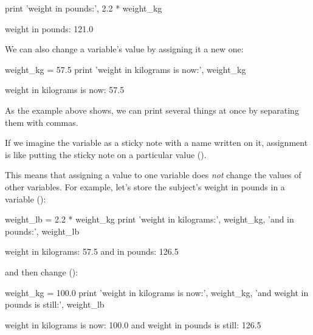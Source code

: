 \begin{VerbIn}
print 'weight in pounds:', 2.2 * weight_kg
\end{VerbIn}

\begin{VerbOut}
weight in pounds: 121.0
\end{VerbOut}

We can also change a variable's value by assigning it a new one:

\begin{VerbIn}
weight_kg = 57.5
print 'weight in kilograms is now:', weight_kg
\end{VerbIn}

\begin{VerbOut}
weight in kilograms is now: 57.5
\end{VerbOut}

As the example above shows, we can print several things at once by
separating them with commas.

If we imagine the variable as a sticky note with a name written on it,
assignment is like putting the sticky note on a particular value ().


This means that assigning a value to one variable does \emph{not} change
the values of other variables. For example, let's store the subject's
weight in pounds in a variable ():

\begin{VerbIn}
weight_lb = 2.2 * weight_kg
print 'weight in kilograms:', weight_kg, 'and in pounds:', weight_lb
\end{VerbIn}

\begin{VerbOut}
weight in kilograms: 57.5 and in pounds: 126.5
\end{VerbOut}


and then change  ():

\begin{VerbIn}
weight_kg = 100.0
print 'weight in kilograms is now:', weight_kg, 'and weight in pounds is still:', weight_lb
\end{VerbIn}

\begin{VerbOut}
weight in kilograms is now: 100.0 and weight in pounds is still: 126.5
\end{VerbOut}

